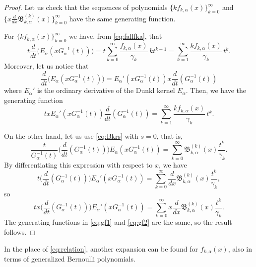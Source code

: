 \documentclass[11pt]{article}
\theoremstyle{plain}
\theoremstyle{remark}
\numberwithin{equation}{section} %
\newcommand{\Ea}{E_{\alpha}}
\newcommand{\B}{\mathfrak{B}}
\newcommand{\cc}{\gamma}
\begin{document}
\begin{proof}
Let us check that the sequences of polynomials $\{kf_{k,\alpha}(x)\}_{k=0}^{\infty}$ and $\{x\frac{d}{dx}\B_{k,\alpha}^{(k)}(x)\}_{k=0}^{\infty}$ have the same generating function. 

For $\{kf_{k,\alpha}(x)\}_{k=0}^{\infty}$ we have, from \eqref{eq:fallfka}, that
\[
t \frac{d}{dt} \Big(\Ea(xG_{\alpha}^{-1}(t))\Big)
= t\sum_{k=0}^{\infty} \frac{f_{k,\alpha}(x)}{\cc_k}\,kt^{k-1} 
= \sum_{k=1}^{\infty} \frac{kf_{k,\alpha}(x)}{\cc_k}\,t^{k}.
\]
Moreover, let us notice that 
\[
\frac{d}{dt} \big(\Ea(xG_{\alpha}^{-1}(t))\big)
= \Ea'(xG_{\alpha}^{-1}(t)) x \frac{d}{dt} (G_{\alpha}^{-1}(t))
\]
where $\Ea'$ is the ordinary derivative of the Dunkl kernel $\Ea$. 
Then, we have the generating function
\begin{equation}
\label{eq:gf1}
tx \Ea'(xG_{\alpha}^{-1}(t)) \frac{d}{dt} (G_{\alpha}^{-1}(t))
= \sum_{k=1}^{\infty} \frac{kf_{k,\alpha}(x)}{\cc_k}\,t^{k}.
\end{equation}

On the other hand, let us use \eqref{eq:Bkrs} with $s=0$, that is,
\[
  \frac{t}{G_{\alpha}^{-1}(t)} 
  \Big(\frac{d}{dt}(G_{\alpha}^{-1}(t))\Big) 
  \Ea(x G_{\alpha}^{-1}(t)) 
  = \sum_{k=0}^{\infty} \B_{k,\alpha}^{(k)}(x) \frac{t^k}{\cc_{k}}.
\]
By differentiating this expression with respect to $x$, we have
\[
  t \Big(\frac{d}{dt}(G_{\alpha}^{-1}(t))\Big) 
  \Ea'(x G_{\alpha}^{-1}(t)) 
  = \sum_{k=0}^{\infty} \frac{d}{dx} \B_{k,\alpha}^{(k)}(x) \frac{t^k}{\cc_{k}},
\]
so
\begin{equation}
\label{eq:gf2}
  tx \Big(\frac{d}{dt}(G_{\alpha}^{-1}(t))\Big) 
  \Ea'(x G_{\alpha}^{-1}(t)) 
  = \sum_{k=0}^{\infty} x \frac{d}{dx} \B_{k,\alpha}^{(k)}(x) \frac{t^k}{\cc_{k}}.
\end{equation}
The generating functions in \eqref{eq:gf1} and \eqref{eq:gf2} are the same, so the result follows.
\end{proof}

In the place of \eqref{eq:relation}, another expansion can be found for $f_{k,\alpha}(x)$, also in terms of generalized Bernoulli polynomials.
\end{document}
